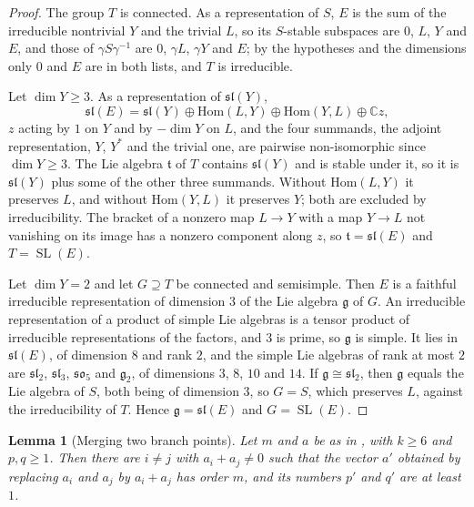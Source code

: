 \documentclass[11pt,reqno]{amsart}
\theoremstyle{plain}
\newtheorem{lemma}[theorem]{Lemma}
\theoremstyle{definition}
\theoremstyle{remark}
\newcommand{\CC}{\mathbb{C}}
\DeclareMathOperator{\SL}{SL}
\begin{document}
\begin{proof}
The group $T$ is connected. As a representation of $S$, $E$ is
the sum of the irreducible nontrivial $Y$ and the trivial $L$, so its
$S$-stable subspaces are $0$, $L$, $Y$ and $E$, and those of
$\gamma S\gamma^{-1}$ are $0$, $\gamma L$, $\gamma Y$ and $E$; by the
hypotheses and the dimensions only $0$ and $E$ are in both lists, and $T$ is
irreducible.

Let $\dim Y\ge3$. As a representation of $\mathfrak{sl}(Y)$,
\[
  \mathfrak{sl}(E)=\mathfrak{sl}(Y)\oplus\mathrm{Hom}(L,Y)\oplus
  \mathrm{Hom}(Y,L)\oplus\CC z,
\]
$z$ acting by $1$ on $Y$ and by $-\dim Y$ on $L$, and the four summands, the
adjoint representation, $Y$, $Y^{*}$ and the trivial one, are pairwise
non-isomorphic since $\dim Y\ge3$. The Lie algebra $\mathfrak{t}$ of $T$
contains $\mathfrak{sl}(Y)$ and is stable under it, so it is
$\mathfrak{sl}(Y)$ plus some of the other three summands. Without
$\mathrm{Hom}(L,Y)$ it preserves $L$, and without $\mathrm{Hom}(Y,L)$ it
preserves $Y$; both are excluded by irreducibility. The bracket of a nonzero
map $L\to Y$ with a map $Y\to L$ not vanishing on its image has a nonzero
component along $z$, so $\mathfrak{t}=\mathfrak{sl}(E)$ and $T=\SL(E)$.

Let $\dim Y=2$ and let $G\supseteq T$ be connected and semisimple. Then $E$
is a faithful irreducible representation of dimension $3$ of the Lie algebra
$\mathfrak{g}$ of $G$. An irreducible representation of a product of simple
Lie algebras is a tensor product of irreducible representations of the
factors, and $3$ is prime, so $\mathfrak{g}$ is simple. It lies in
$\mathfrak{sl}(E)$, of dimension $8$ and rank $2$, and the simple Lie
algebras of rank at most $2$ are $\mathfrak{sl}_{2}$, $\mathfrak{sl}_{3}$,
$\mathfrak{so}_{5}$ and $\mathfrak{g}_{2}$, of dimensions $3$, $8$, $10$ and
$14$. If $\mathfrak{g}\cong\mathfrak{sl}_{2}$, then $\mathfrak{g}$ equals the
Lie algebra of $S$, both being of dimension $3$, so $G=S$, which preserves
$L$, against the irreducibility of $T$. Hence $\mathfrak{g}=\mathfrak{sl}(E)$
and $G=\SL(E)$.
\end{proof}

\begin{lemma}[Merging two branch points]\label{lem:merge}
Let $m$ and $a$ be as in , with $k\ge6$ and $p,q\ge1$.
Then there are $i\ne j$ with $a_{i}+a_{j}\ne0$ such that the vector $a'$
obtained by replacing $a_{i}$ and $a_{j}$ by $a_{i}+a_{j}$ has order $m$, and
its numbers $p'$ and $q'$ are at least $1$.
\end{lemma}
\end{document}
